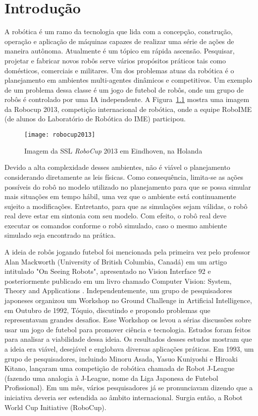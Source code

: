 \chapter{Introdução}

A robótica é um ramo da tecnologia que lida com a concepção, construção,
operação e aplicação de máquinas capazes de realizar uma série de ações de
maneira autônoma.  Atualmente é um tópico em rápida ascensão.  Pesquisar,
projetar e fabricar novos robôs serve vários propósitos práticos tais como
domésticos, comerciais e militares.  Um dos problemas atuas da robótica é o
planejamento em ambientes multi-agentes dinâmicos e competitivos.  Um exemplo de
um problema dessa classe é um jogo de futebol de robôs, onde um grupo de robôs é
controlado por uma IA independente.  A Figura~\ref{fig:robocup2013} mostra uma
imagem da Robocup 2013, competição internacional de robótica, onde a equipe
RoboIME (de alunos do Laboratório de Robótica do IME) participou.

\begin{figure}[h]
  \centering
  \texttt{[image: robocup2013]}
  \caption{Imagem da SSL \textit{RoboCup} 2013 em Eindhoven, na Holanda}\label{fig:robocup2013}
\end{figure}

Devido a alta complexidade desses ambientes, não é viável o planejamento
considerando diretamente as leis físicas.  Como consequência, limita-se as ações
possíveis do robô no modelo utilizado no planejamento para que se possa simular
mais situações em tempo hábil, uma vez que o ambiente está continuamente sujeito
a modificações.  Entretanto, para que as simulações sejam válidas, o robô real
deve estar em sintonia com seu modelo.  Com efeito, o robô real deve executar os
comandos conforme o robô simulado, caso o mesmo ambiente simulado seja
encontrado na prática.

A ideia de robôs jogando futebol foi mencionada pela primeira vez pelo professor
Alan Mackworth (University of British Columbia, Canadá) em um artigo intitulado
"On Seeing Robots", apresentado no Vision Interface 92 e posteriormente
publicado em um livro chamado Computer Vision: System, Theory and Applications
\cite{basu1993computer}.  Independentemente, um grupo de pesquisadores japoneses
organizou um Workshop no Ground Challenge in Artificial Intelligence, em Outubro
de 1992, Tóquio, discutindo e propondo problemas que representavam grandes
desafios.  Esse Workshop os levou a sérias discussões sobre usar um jogo de
futebol para promover ciência e tecnologia.  Estudos foram feitos para analisar
a viabilidade dessa ideia.  Os resultados desses estudos mostram que a ideia era
viável, desejável e englobava diversas aplicações práticas.  Em 1993, um grupo
de pesquisadores, incluindo Minoru Asada, Yasuo Kuniyoshi e Hiroaki Kitano,
lançaram uma competição de robótica chamada de Robot J-League (fazendo uma
analogia à J-League, nome da Liga Japonesa de Futebol Profissional).  Em um mês,
vários pesquisadores já se pronunciavam dizendo que a iniciativa deveria ser
estendida ao âmbito internacional.  Surgia então, a Robot World Cup Initiative
(RoboCup).

